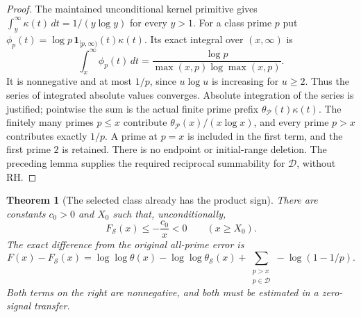 \documentclass[11pt]{article}
\newtheorem{theorem}{Theorem}[section]
\theoremstyle{definition}
\begin{document}
\begin{proof}
The maintained unconditional kernel primitive gives
$\int_y^\infty\kappa(t)\,dt=1/(y\log y)$ for every $y>1$.
For a class prime $p$ put
$\phi_p(t)=\log p\,\boldsymbol1_{[p,\infty)}(t)\kappa(t)$.
Its exact integral over $(x,\infty)$ is
\[
 \int_x^\infty\phi_p(t)\,dt
 =\frac{\log p}
        {\max(x,p)\log\max(x,p)}.
\]
It is nonnegative and at most $1/p$, since
$u\log u$ is increasing for $u\ge2$.
Thus the series of integrated absolute values converges.
Absolute integration of the series is justified; pointwise the sum
is the actual finite prime prefix
$\theta_{\mathcal P}(t)\kappa(t)$.
The finitely many primes $p\le x$ contribute
$\theta_{\mathcal P}(x)/(x\log x)$, and every prime $p>x$
contributes exactly $1/p$.
A prime at $p=x$ is included in the first term, and the first prime
$2$ is retained. There is no endpoint or initial-range deletion.
The preceding lemma supplies the required reciprocal summability
for $\mathcal D$, without RH.
\end{proof}

\begin{theorem}[The selected class already has the product sign]
\label{prop:greedy-prime-product-sign}
There are constants $c_0>0$ and $X_0$ such that, unconditionally,
\begin{equation}
 F_{\mathcal S}(x)\le-\frac{c_0}{x}<0\qquad(x\ge X_0).
 \label{eq:greedy-prime-product-sign}
\end{equation}
The exact difference from the original all-prime error is
\begin{equation}
 F(x)-F_{\mathcal S}(x)
 =\log\log\theta(x)-\log\log\theta_{\mathcal S}(x)
       +\sum_{\substack{p>x\\p\in\mathcal D}}-\log(1-1/p).
 \label{eq:greedy-prime-product-signal}
\end{equation}
Both terms on the right are nonnegative, and both must be
estimated in a zero-signal transfer.
\end{theorem}
\end{document}
